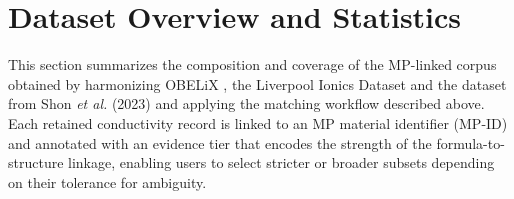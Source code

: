 \documentclass[a4paper,fleqn]{cas-sc}
\begin{document}



\section{Dataset Overview and Statistics}
This section summarizes the composition and coverage of the MP-linked corpus obtained by harmonizing OBELiX \cite{therrien2025obelix}, the Liverpool Ionics Dataset \cite{durdy2023liverpool, hargreaves2023database} and the dataset from Shon \textit{et al.} (2023) \cite{shon2023extracting} and applying the matching workflow described above. Each retained conductivity record is linked to an MP material identifier (MP-ID) and annotated with an evidence tier that encodes the strength of the formula-to-structure linkage, enabling users to select stricter or broader subsets depending on their tolerance for ambiguity.
\end{document}
